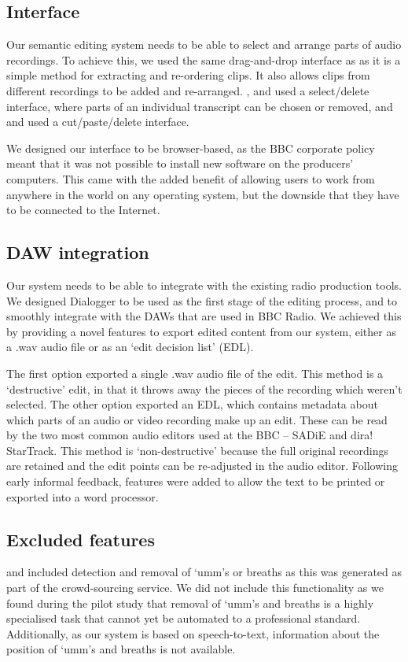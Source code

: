 \subsection{Interface}
Our semantic editing system needs to be able to select and arrange parts of audio recordings. To achieve this, we used
the same drag-and-drop interface as \citet{Hyperaudio2016} as it is a simple method for extracting and re-ordering
clips. It also allows clips from different recordings to be added and re-arranged. \citet{Casares2002},
\citet{Sivaraman2016} and \citet{Berthouzoz2012} used a select/delete interface, where parts of an individual
transcript can be chosen or removed, and \citep{Whittaker2004} and \citet{Rubin2013} used a cut/paste/delete interface.

We designed our interface to be browser-based, as the BBC corporate policy meant that it was not possible to install
new software on the producers' computers. This came with the added benefit of allowing users to work from anywhere in
the world on any operating system, but the downside that they have to be connected to the Internet.

\subsection{DAW integration}
Our system needs to be able to integrate with the existing radio production tools. We designed Dialogger to be used as
the first stage of the editing process, and to smoothly integrate with the DAWs that are used in BBC Radio. We achieved
this by providing a novel features to export edited content from our system, either as a .wav audio file or as an `edit
decision list' (EDL).

The first option exported a single .wav audio file of the edit. This method is a `destructive' edit, in that it throws
away the pieces of the recording which weren't selected.  The other option exported an EDL, which contains metadata
about which parts of an audio or video recording make up an edit. These can be read by the two most common audio
editors used at the BBC -- SADiE and dira! StarTrack.  This method is `non-destructive' because the full original
recordings are retained and the edit points can be re-adjusted in the audio editor.  Following early informal feedback,
features were added to allow the text to be printed or exported into a word processor.

\subsection{Excluded features}
\citet{Rubin2013} and \citet{Berthouzoz2012} included detection and removal of `umm's or breaths as this was generated
as part of the crowd-sourcing service.  We did not include this functionality as we found during the pilot study that
removal of `umm's and breaths is a highly specialised task that cannot yet be automated to a professional standard.
Additionally, as our system is based on speech-to-text, information about the position of `umm's and breaths is not
available.

